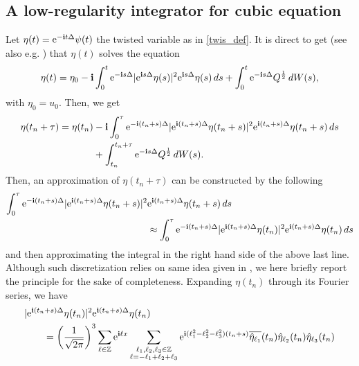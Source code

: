 \documentclass[a4paper]{amsart}
\begin{document}
\subsection{A low-regularity integrator for cubic equation}
Let $\eta(t)={\rm e}^{-{\bf i}t\Delta} \psi(t)$ the twisted variable as in \eqref{twis_def}. It is direct to get (see also e.g. \cite{os_ka}) that $\eta(t)$ solves the equation
$$
\eta(t)=\eta_0-{\bf i}\int_0^t {\rm e}^{-{\bf i}s\Delta}|{\rm e}^{{\bf i}s\Delta} \eta(s)|^2 {\rm e}^{{\bf i}s\Delta} \eta(s) \,ds+\int_0^t {\rm e}^{-{\bf i}s\Delta} Q^{\frac{1}{2}}\,dW(s),
$$
with $\eta_0=u_0$. Then, we get 
\begin{align}
\eta(t_n+\tau)=\eta(t_n)&-{\bf i}\int_0^\tau {\rm e}^{-{\bf i}(t_n+s)\Delta}|{\rm e}^{{\bf i}(t_n+s)\Delta}\eta(t_n+s)|^2 {\rm e}^{{\bf i}(t_n+s)\Delta}\eta(t_n+s)\,ds\notag \\
& +\int_{t_n}^{t_n+\tau} {\rm e}^{-{\bf i}s\Delta} Q^{\frac{1}{2}}\,dW(s)  \label{mild_cub_twis}.
\end{align}
Then, an approximation of $\eta(t_n+\tau)$ can be constructed by the following 
$$
\begin{aligned}
\int_0^\tau {\rm e}^{-{\bf i}(t_n+s)\Delta}|{\rm e}^{{\bf i}(t_n+s)\Delta}\eta(t_n+s)|^2 & {\rm e}^{{\bf i}(t_n+s)\Delta}\eta(t_n+s)\,ds  \\
&\approx \int_0^\tau {\rm e}^{-{\bf i}(t_n+s)\Delta}|{\rm e}^{{\bf i}(t_n+s)\Delta}\eta(t_n)|^2 {\rm e}^{{\bf i}(t_n+s)\Delta}\eta(t_n)\,ds
\end{aligned}
$$
and then approximating the integral in the right hand side of the above last line. Although such discretization relies on same idea given in \cite{os_ka}, we here briefly report the principle for the sake of completeness. Expanding $\eta(t_n)$ through its Fourier series, we have
\begin{align*}
&|{\rm e}^{{\bf i}(t_n+s)\Delta}\eta(t_n)|^2 {\rm e}^{{\bf i}(t_n+s)\Delta}\eta(t_n)\\
&\qquad =\bigg(\frac{1}{\sqrt{2\pi}}\bigg)^{3}\sum_{\ell\in\mathbb{Z}}{\rm e}^{{\bf i}\ell x}
\sum_{\substack{\ell_1,\ell_2,\ell_3\in\mathbb{Z}\\ \ell=-\ell_1+\ell_2+\ell_3}}{\rm e}^{{\bf i}(\ell_1^2-\ell_2^2-\ell_3^2)(t_n+s)}\overline{\hat{\eta}_{\ell_1}}(t_n)
\hat{\eta}_{\ell_2}(t_n)\hat{\eta}_{\ell_3}(t_n)
\end{align*}
\end{document}

